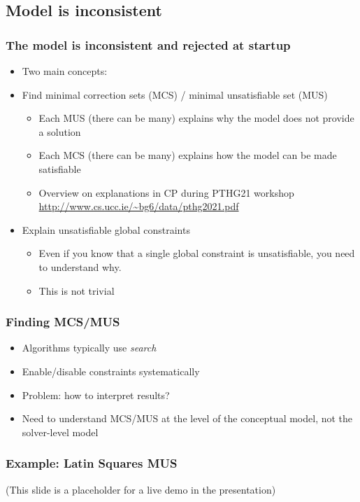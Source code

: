 \subsection{Model is inconsistent}

\begin{frame}
\frametitle{The model is inconsistent and rejected at startup}
\vspace{5em}
\begin{itemize}
\item Two main concepts:
\item Find minimal correction sets (MCS) / minimal unsatisfiable set (MUS)
\begin{itemize}
\item Each MUS (there can be many) explains why the model does not provide a solution
\item Each MCS (there can be many) explains how the model can be made satisfiable
\item Overview on explanations in CP during PTHG21 workshop \url{http://www.cs.ucc.ie/~bg6/data/pthg2021.pdf}\cite{DBLP:conf/ijcai/GuptaGO21}
\end{itemize}
\item Explain unsatisfiable global constraints
\begin{itemize}
\item Even if you know that a single global constraint is unsatisfiable, you need to understand why.
\item This is not trivial
\end{itemize}
\end{itemize}
\end{frame}

\begin{frame}
\frametitle{Finding MCS/MUS}
\begin{itemize}
\item Algorithms typically use \emph{search}
\item Enable/disable constraints systematically
\item Problem: how to interpret results?
\item Need to understand MCS/MUS at the level of the conceptual model, not the solver-level model
\end{itemize}
\end{frame}

\begin{frame}
\frametitle{Example: Latin Squares MUS}

(This slide is a placeholder for a live demo in the presentation)

\end{frame}


